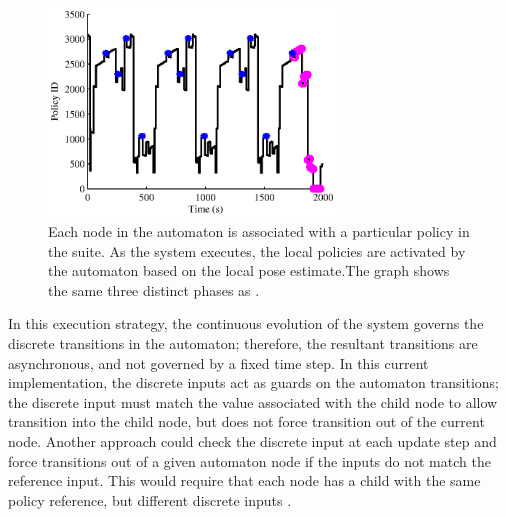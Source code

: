 \begin{figure}[bt]
  \centering 
   \includegraphics[width=3in]{graphics/AutRnd5_Sim8_policies.eps}

   \caption[`LAGR' timid night watch policy switching.]{Each node in
     the automaton is associated with a particular policy in the
     suite.  As the system executes, the local policies are activated
     by the automaton based on the local pose estimate.The graph shows
     the same three distinct phases as
     .}
   \label{fig:lagr_Aautomaton_full_policies}
\end{figure}

In this execution strategy, the continuous evolution of the system governs the
discrete transitions in the automaton; therefore, the resultant transitions are
asynchronous, and not governed by a fixed time step.  In this current implementation,
the discrete inputs act as guards on the automaton transitions; the discrete input
must match the value associated with the child node to allow transition into the
child node, but does not force transition out of the current node.  Another approach
could check the discrete input at each update step and force transitions out of a
given automaton node if the inputs do not match the reference input.  This would
require that each node has a child with the same policy reference, but different
discrete inputs .


